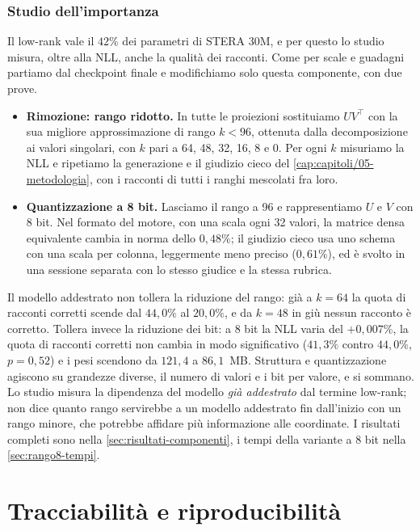 \subsubsection{Studio dell'importanza}
\label{sec:studio-basso-rango}
Il low-rank vale il $42\%$ dei parametri di STERA 30M, e per questo lo studio misura, oltre alla NLL, anche la qualità dei racconti. Come per scale e guadagni partiamo dal checkpoint finale e modifichiamo solo questa componente, con due prove.
\begin{itemize}
\item \textbf{Rimozione: rango ridotto.} In tutte le proiezioni sostituiamo $UV^\top$ con la sua migliore approssimazione di rango $k<96$, ottenuta dalla decomposizione ai valori singolari, con $k$ pari a 64, 48, 32, 16, 8 e 0. Per ogni $k$ misuriamo la NLL e ripetiamo la generazione e il giudizio cieco del \autoref{cap:capitoli/05-metodologia}, con i racconti di tutti i ranghi mescolati fra loro.
\item \textbf{Quantizzazione a 8 bit.} Lasciamo il rango a 96 e rappresentiamo $U$ e $V$ con 8 bit. Nel formato del motore, con una scala ogni 32 valori, la matrice densa equivalente cambia in norma dello $0{,}48\%$; il giudizio cieco usa uno schema con una scala per colonna, leggermente meno preciso ($0{,}61\%$), ed è svolto in una sessione separata con lo stesso giudice e la stessa rubrica.
\end{itemize}
Il modello addestrato non tollera la riduzione del rango: già a $k=64$ la quota di racconti corretti scende dal $44{,}0\%$ al $20{,}0\%$, e da $k=48$ in giù nessun racconto è corretto. Tollera invece la riduzione dei bit: a 8 bit la NLL varia del $+0{,}007\%$, la quota di racconti corretti non cambia in modo significativo ($41{,}3\%$ contro $44{,}0\%$, $p=0{,}52$) e i pesi scendono da $121{,}4$ a $86{,}1$~MB. Struttura e quantizzazione agiscono su grandezze diverse, il numero di valori e i bit per valore, e si sommano. Lo studio misura la dipendenza del modello \emph{già addestrato} dal termine low-rank; non dice quanto rango servirebbe a un modello addestrato fin dall'inizio con un rango minore, che potrebbe affidare più informazione alle coordinate. I risultati completi sono nella \autoref{sec:risultati-componenti}, i tempi della variante a 8 bit nella \autoref{sec:rango8-tempi}.

\section{Tracciabilità e riproducibilità}
\label{sec:riproducibilita-stera30m}

